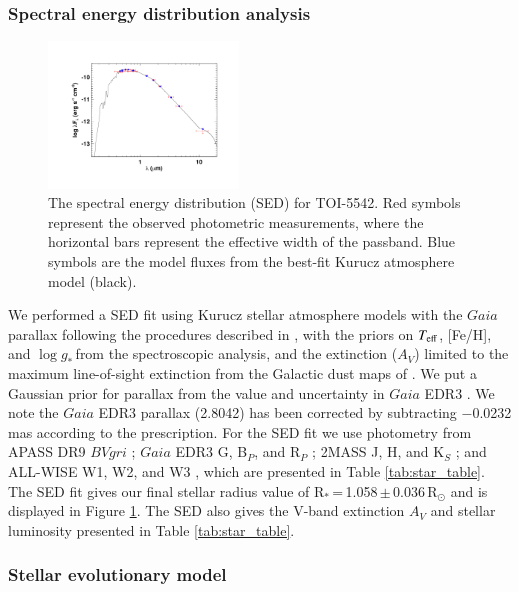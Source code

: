 \documentclass{aa}
\newcommand{\feh}{\mbox{[Fe/H]}\xspace}
\newcommand{\teff}{\ensuremath{T_{\rm eff}}\xspace}
\newcommand{\logg}{\mbox{$\log g_*$}\,}
\newcommand{\rstar}{\mbox{R$_{*}$}}
\newcommand{\rsol}{\mbox{$\mathrm{R_\odot}$}\xspace}
\begin{document}
\subsubsection{Spectral energy distribution analysis} \label{sec:SED}

\begin{figure}
  \centering
  \includegraphics[width=0.45\textwidth]{figures/TIC466206508_SED.pdf}
  \caption{The spectral energy distribution (SED) for TOI-5542. Red symbols represent the observed photometric measurements, where the horizontal bars represent the effective width of the passband. Blue symbols are the model fluxes from the best-fit Kurucz atmosphere model (black).}
  \label{fig:sed_keivan}
\end{figure}

We performed a SED fit using Kurucz stellar atmosphere models \citep{Kurucz2013} with the $Gaia$ parallax following the procedures described in \citet{StassunTorres2016,Stassun2017,Stassun2018}, with the priors on \teff, \feh, and \logg from the spectroscopic analysis, and the extinction ($A_V$) limited to the maximum line-of-sight extinction from the Galactic dust maps of \citet{Schlegel1998}. We put a Gaussian prior for parallax from the value and uncertainty in $Gaia$ EDR3 \citep{GaiaCollaboration2021}. We note the $Gaia$ EDR3 parallax (2.8042) has been corrected by subtracting $-$0.0232 mas according to the \citet{Lindegren2021} prescription. For the SED fit we use photometry from APASS DR9 $BVgri$ \citep{Henden2016}; 
$Gaia$ EDR3 G, B$_P$, and R$_P$ \citep{GaiaCollaboration2021}; 2MASS J, H, and K$_S$ \citep{Skrutskie2006}; and ALL-WISE W1, W2, and W3 \citep{Wright2010}, which are presented in Table \ref{tab:star_table}. The SED fit gives our final stellar radius value of \rstar\,=\,1.058\,$\pm$\,0.036\,\rsol and is displayed in Figure \ref{fig:sed_keivan}. The SED also gives the V-band extinction $A_{V}$ and stellar luminosity presented in Table \ref{tab:star_table}.

\subsubsection{Stellar evolutionary model} \label{sec:star_mist}
\end{document}
